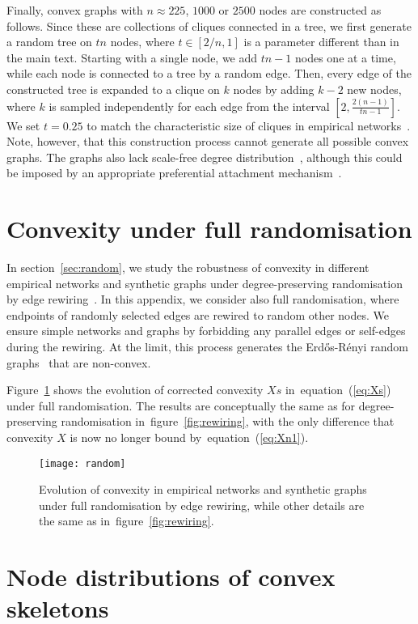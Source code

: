 \documentclass[]{rsif}
\newcommand{\secref}[1]{section~\ref{sec:#1}\xspace}
\newcommand{\figref}[1]{figure~\ref{fig:#1}\xspace}
\newcommand{\Figref}[1]{Figure~\ref{fig:#1}\xspace}
\renewcommand{\eqref}[1]{equation~(\ref{eq:#1})\xspace}
\begin{document}
Finally, convex graphs with $n\approx 225$, $1000$ or $2500$ nodes are constructed as follows. Since these are collections of cliques connected in a tree, we first generate a random tree on $tn$ nodes, where $t\in[2/n,1]$ is a parameter different than in the main text. Starting with a single node, we add $tn-1$ nodes one at a time, while each node is connected to a tree by a random edge. Then, every edge of the constructed tree is expanded to a clique on $k$ nodes by adding $k-2$ new nodes, where $k$ is sampled independently for each edge from the interval $[2,\frac{2(n-1)}{tn-1}]$. We set $t=0.25$ to match the characteristic size of cliques in empirical networks~\cite{SIL14}. Note, however, that this construction process cannot generate all possible convex graphs. The graphs also lack scale-free degree distribution~\cite{BA99}, although this could be imposed by an appropriate preferential attachment mechanism~\cite{HAMND11}.

\section{\label{app:random}Convexity under full randomisation}

In \secref{random}, we study the robustness of convexity in different empirical networks and synthetic graphs under degree-preserving randomisation by edge rewiring~\cite{MS02}. In this appendix, we consider also full randomisation, where endpoints of randomly selected edges are rewired to random other nodes. We ensure simple networks and graphs by forbidding any parallel edges or self-edges during the rewiring. At the limit, this process generates the Erd\H{o}s-R\'{e}nyi random graphs~\cite{ER59} that are non-convex.

\Figref{random} shows the evolution of corrected convexity $Xs$ in~\eqref{Xs} under full randomisation. The results are conceptually the same as for degree-preserving randomisation in~\figref{rewiring}, with the only difference that convexity $X$ is now no longer bound by~\eqref{Xn1}.

\begin{figure}[h]
	\centering\texttt{[image: random]}
	\caption{\label{fig:random}Evolution of convexity in empirical networks and synthetic graphs under full randomisation by edge rewiring, while other details are the same as in~\figref{rewiring}.} 
\end{figure}

\section{\label{app:nodes}Node distributions of convex skeletons}
\end{document}
